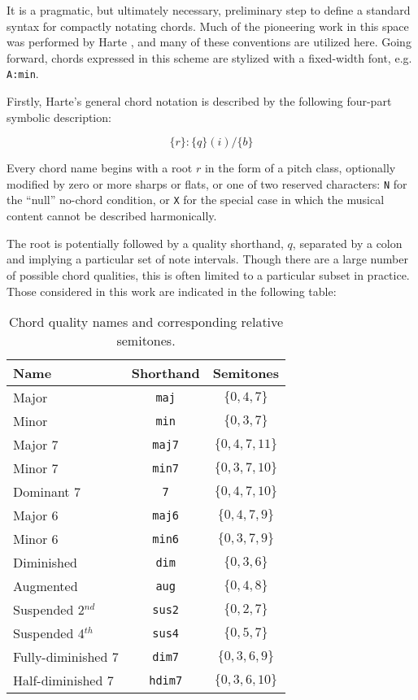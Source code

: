 It is a pragmatic, but ultimately necessary, preliminary step to define a standard syntax for compactly notating chords.
Much of the pioneering work in this space was performed by Harte \cite{Harte2010}, and many of these conventions are utilized here.
Going forward, chords expressed in this scheme are stylized with a fixed-width font, e.g. \texttt{A:min}.

Firstly, Harte's general chord notation is described by the following four-part symbolic description:

\begin{equation}
\{r\}:\{q\}(i)/\{b\}
\end{equation}

\noindent Every chord name begins with a root $r$ in the form of a pitch class, optionally modified by zero or more sharps or flats, or one of two reserved characters: \texttt{N} for the ``null'' no-chord condition, or \texttt{X} for the special case in which the musical content cannot be described harmonically.

The root is potentially followed by a quality shorthand, $q$, separated by a colon and implying a particular set of note intervals.
Though there are a large number of possible chord qualities, this is often limited to a particular subset in practice.
Those considered in this work are indicated in the following table:

\begin{table}[h]
\begin{center}
\caption{Chord quality names and corresponding relative semitones.}
\label{tab:qualities}
\begin{tabular}{l | c | c}
Name & Shorthand & Semitones \\
\hline
Major & \texttt{maj} & $\{0, 4, 7\}$ \\
Minor & \texttt{min} & $\{0, 3, 7\}$ \\
Major 7 & \texttt{maj7} & $\{0, 4, 7, 11\}$ \\
Minor 7 & \texttt{min7} & $\{0, 3, 7, 10\}$ \\
Dominant 7 & \texttt{7} & $\{0, 4, 7, 10\}$ \\
Major 6 & \texttt{maj6} & $\{0, 4, 7, 9\}$ \\
Minor 6 & \texttt{min6} & $\{0, 3, 7, 9\}$ \\
Diminished & \texttt{dim} & $\{0, 3, 6\}$ \\
Augmented & \texttt{aug} & $\{0, 4, 8\}$ \\
Suspended 2$^{nd}$ & \texttt{sus2} & $\{0, 2, 7\}$ \\
Suspended 4$^{th}$ & \texttt{sus4} & $\{0, 5, 7\}$ \\
Fully-diminished 7 & \texttt{dim7} & $\{0, 3, 6, 9\}$ \\
Half-diminished 7 & \texttt{hdim7} & $\{0, 3, 6, 10\}$ \\
\hline
\end{tabular}
\end{center}
\end{table}


